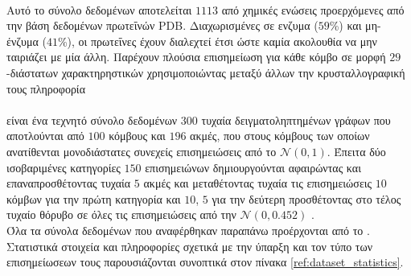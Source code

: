 \paragraph*{} Αυτό το σύνολο δεδομένων αποτελείται $1113$ από χημικές ενώσεις προερχόμενες από την βάση δεδομένων πρωτεΐνών PDB.
Διαχωρισμένες σε ενζυμα ($59$\%) και μη-ένζυμα ($41$\%), οι πρωτεΐνες έχουν διαλεχτεί έτσι ώστε καμία ακολουθία να μην ταιριάζει με μία άλλη.
Παρέχουν πλούσια επισημείωση για κάθε κόμβο σε μορφή $29$-διάστατων χαρακτηρηστικών χρησιμοποιώντας μεταξύ άλλων την κρυσταλλογραφική τους πληροφορία \cite{DobsonDoig03, borgwardt2005protein, Neumann2016}

\paragraph*{} είναι ένα τεχνητό σύνολο δεδομένων $300$ τυχαία δειγματοληπτημένων γράφων που αποτλούνται από $100$ κόμβους και $196$ ακμές, που στους κόμβους των οποίων ανατίθενται μονοδιάστατες συνεχείς επισημειώσεις από το $\mathcal{N}(0, 1)$.
Έπειτα δύο ισοβαριμένες κατηγορίες $150$ επισημειώνων δημιουργούνται αφαιρώντας και επαναπροσθέτοντας τυχαία $5$ ακμές και μεταθέτοντας τυχαία τις επισημειώσεις $10$ κόμβων για την πρώτη κατηγορία και $10$, $5$ για την δεύτερη προσθέτοντας στο τέλος τυχαίο θόρυβο σε όλες τις επισημειώσεις από την $\mathcal{N}(0, 0.452)$ \cite{Feragen13}.
\newline \\
Όλα τα σύνολα δεδομένων που αναφέρθηκαν παραπάνω προέρχονται από το \cite{KKMMN2016}. Στατιστικά στοιχεία και πληροφορίες σχετικά με την ύπαρξη και τον τύπο των επισημείωσεων τους παρουσιάζονται συνοπτικά στον πίνακα \ref{ref:dataset_statistics}.

